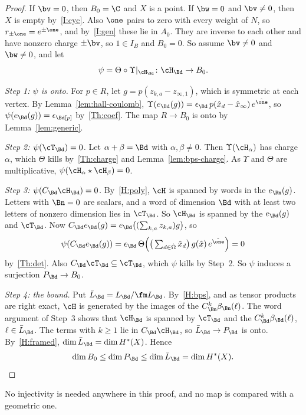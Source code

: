 \begin{proof}
If $\bv=0$, then $B_0=\C$ and $X$ is a point.  If $\bw=0$ and $\bv\neq0$,
then $X$ is empty by~\ref{I:cyc}.  Also $\one$ pairs to zero with every weight
of $N$, so $r_{\pm\one}=e^{\pm\one}$, and by~\ref{I:gen} these lie in $A_0$.
They are inverse to each other and have nonzero charge $\pm\bv$, so $1\in I_B$
and $B_0=0$.  So assume $\bv\neq0$ and $\bw\neq0$, and let
\[
 \psi=\Theta\circ\Upsilon|_{\cH_\Bd}\colon\cH_\Bd\to B_0 .
\]

\emph{Step 1: $\psi$ is onto.}  For $p\in R$, let $g=p(z_{k,a}-z_{\infty,1})$,
which is symmetric at each vertex.  By Lemma~\ref{lem:hall-coulomb},
$\Upsilon(e_\Bd(g))=\epsilon_\Bd\,p(\hat x_d-\hat x_\infty)\,e^{\hat\one}$, so
$\psi(e_\Bd(g))=\epsilon_\Bd[p]$ by~\ref{Th:coef}.  The map $R\to B_0$ is onto
by Lemma~\ref{lem:generic}.

\emph{Step 2: $\psi(\cT_\Bd)=0$.}  Let $\alpha+\beta=\Bd$ with
$\alpha,\beta\neq0$.  Then $\Upsilon(\cH_\alpha)$ has charge $\alpha$, which
$\Theta$ kills by~\ref{Th:charge} and Lemma~\ref{lem:bps-charge}.  As $\Upsilon$
and $\Theta$ are multiplicative, $\psi(\cH_\alpha\star\cH_\beta)=0$.

\emph{Step 3: $\psi(C_\Bd\cH_\Bd)=0$.}  By~\ref{H:poly}, $\cH$ is spanned by
words in the $e_\Bn(g)$.  Letters with $\Bn=0$ are scalars, and a word of
dimension $\Bd$ with at least two letters of nonzero dimension lies in
$\cT_\Bd$.  So $\cH_\Bd$ is spanned by the $e_\Bd(g)$ and $\cT_\Bd$.  Now
$C_\Bd e_\Bd(g)=e_\Bd\big((\sum_{k,a}z_{k,a})g\big)$, so
\[
 \psi(C_\Bd e_\Bd(g))=\epsilon_\Bd\,\Theta\Big(\big(\textstyle\sum_{d\in\hat\Omega}\hat x_d\big)\,g(\hat x)\,e^{\hat\one}\Big)=0
\]
by~\ref{Th:det}.  Also $C_\Bd\cT_\Bd\subseteq\cT_\Bd$, which $\psi$ kills by
Step~2.  So $\psi$ induces a surjection $P_\Bd\to B_0$.

\emph{Step 4: the bound.}  Put $\bar L_\Bd=L_\Bd/\fm L_\Bd$.  By~\ref{H:bps},
and as tensor products are right exact, $\cH$ is generated by the images of
the $C_\Bn^k\beta_\Bn(\ell)$.  The word argument of Step~3 shows that $\cH_\Bd$
is spanned by $\cT_\Bd$ and the $C_\Bd^k\beta_\Bd(\ell)$, $\ell\in\bar L_\Bd$.
The terms with $k\ge1$ lie in $C_\Bd\cH_\Bd$, so $\bar L_\Bd\to P_\Bd$ is onto.
By~\ref{H:framed}, $\dim\bar L_\Bd=\dim H^*(X)$.  Hence
\[
 \dim B_0\le\dim P_\Bd\le\dim\bar L_\Bd=\dim H^*(X).\qedhere
\]
\end{proof}

No injectivity is needed anywhere in this proof, and no map is compared with
a geometric one.

